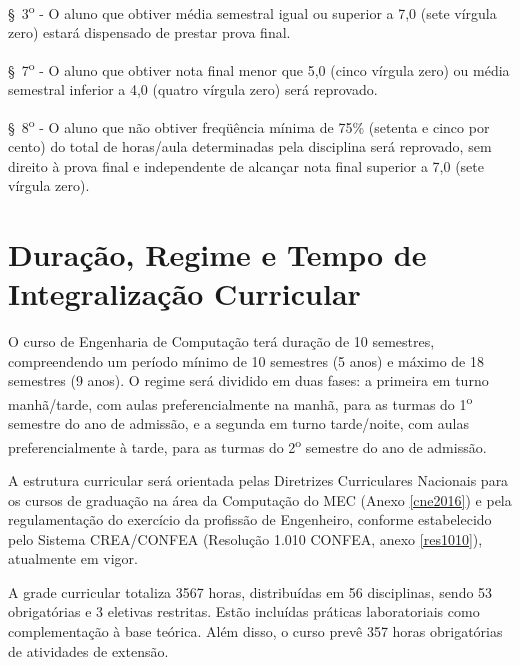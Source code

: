 \S~3\textsuperscript{o} - O aluno que obtiver média semestral igual ou superior a 7,0 (sete vírgula zero) estará dispensado de prestar prova final.

\S~7\textsuperscript{o} - O aluno que obtiver nota final menor que 5,0 (cinco vírgula zero) ou média semestral inferior a 4,0 (quatro vírgula zero) será reprovado.

\S~8\textsuperscript{o} - O aluno que não obtiver freqüência mínima de 75\% (setenta e cinco por cento) do total de horas/aula determinadas pela disciplina será reprovado, sem direito à prova final e independente de alcançar nota final superior a 7,0 (sete vírgula zero).


\section{Duração, Regime e Tempo de Integralização Curricular}

O curso de Engenharia de Computação terá duração de 10 semestres, compreendendo um período mínimo de 10 semestres (5 anos) e máximo de 18 semestres (9 anos). O regime será dividido em duas fases: a primeira em turno manhã/tarde, com aulas preferencialmente na manhã, para as turmas do 1\textsuperscript{o} semestre do ano de admissão, e a segunda em turno tarde/noite, com aulas preferencialmente à tarde, para as turmas do 2\textsuperscript{o} semestre do ano de admissão.

A estrutura curricular será orientada pelas Diretrizes Curriculares Nacionais para os
cursos de graduação na área da Computação do MEC (Anexo \ref{cne2016}) e pela regulamentação do exercício da profissão de Engenheiro, conforme estabelecido pelo Sistema CREA/CONFEA (Resolução 1.010 CONFEA, anexo \ref{res1010}), atualmente em vigor.

A grade curricular totaliza 3567 horas, distribuídas em 56 disciplinas, sendo 53 obrigatórias e 3 eletivas restritas. Estão incluídas práticas laboratoriais como complementação à base teórica. Além disso, o curso prevê 357 horas obrigatórias de atividades de extensão.

